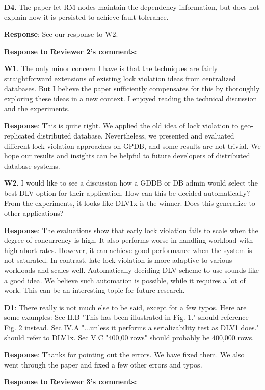 \documentclass[conference]{IEEEtran}
\begin{document}
\begin{frame}{\relax}
\textbf{D4}. The paper let RM nodes maintain the dependency information, but does not explain how it is persisted to achieve fault tolerance.

\textbf{Response}: See our response to W2.


\textbf{Response to Reviewer 2’s comments:}

\textbf{W1}. The only minor concern I have is that the techniques are fairly straightforward extensions of existing lock violation ideas from centralized databases. But I believe the paper sufficiently compensates for this by thoroughly exploring these ideas in a new context. I enjoyed reading the technical discussion and the experiments.

\textbf{Response}: This is quite right. We applied the old idea of lock violation to geo-replicated distributed database. Nevertheless, we presented and evaluated different lock violation approaches on GPDB, and some results are not trivial. We hope our results and insights can be helpful to future developers of distributed database systems.

\textbf{W2}. I would like to see a discussion how a GDDB or DB admin would select the best DLV option for their application. How can this be decided automatically? From the experiments, it looks like DLV1x is the winner. Does this generalize to other applications?

\textbf{Response}: The evaluations show that early lock violation fails to scale when the degree of concurrency is high. It also performs worse in handling workload with high abort rates. However, it can achieve good performance when the system is not saturated. In contrast, late lock violation is more adaptive to various workloads and scales well. 
Automatically deciding DLV scheme to use sounds like a good idea. We believe such automation is possible, while it requires a lot of work. This can be an interesting topic for future research.

\textbf{D1}: There really is not much else to be said, except for a few typos. Here are some examples: Sec II.B "This has been illustrated in Fig. 1." should reference Fig. 2 instead. Sec IV.A "...unless it performs a serializability test as DLV1 does." should refer to DLV1x. Sec V.C "400,00 rows" should probably be 400,000 rows.

\textbf{Response}: Thanks for pointing out the errors. We have fixed them. We also went through the paper and fixed a few other errors and typos. 

\textbf{Response to Reviewer 3’s comments:}


\end{frame}
\end{document}
